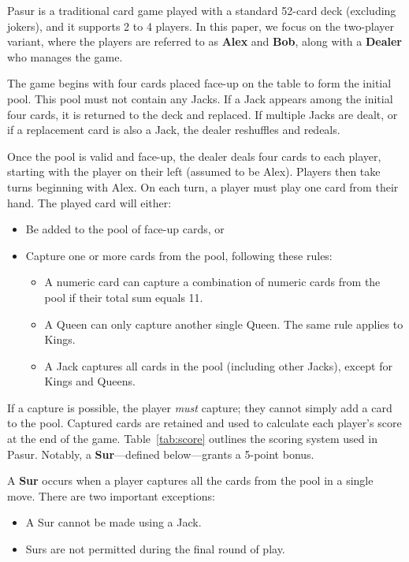 % 

Pasur is a traditional card game played with a standard 52-card deck (excluding jokers), and it supports 2 to 4 players. In this paper, we focus on the two-player variant, where the players are referred to as \textbf{Alex} and \textbf{Bob}, along with a \textbf{Dealer} who manages the game.

The game begins with four cards placed face-up on the table to form the initial pool. This pool must not contain any Jacks. If a Jack appears among the initial four cards, it is returned to the deck and replaced. If multiple Jacks are dealt, or if a replacement card is also a Jack, the dealer reshuffles and redeals.

Once the pool is valid and face-up, the dealer deals four cards to each player, starting with the player on their left (assumed to be Alex). Players then take turns beginning with Alex. On each turn, a player must play one card from their hand. The played card will either:

\begin{itemize}
    \item Be added to the pool of face-up cards, or
    \item Capture one or more cards from the pool, following these rules:
    \begin{itemize}
        \item A numeric card can capture a combination of numeric cards from the pool if their total sum equals 11.
        \item A Queen can only capture another single Queen. The same rule applies to Kings.
        \item A Jack captures all cards in the pool (including other Jacks), except for Kings and Queens.
    \end{itemize}
\end{itemize}

If a capture is possible, the player \emph{must} capture; they cannot simply add a card to the pool. Captured cards are retained and used to calculate each player’s score at the end of the game. Table~\ref{tab:score} outlines the scoring system used in Pasur. Notably, a \textbf{Sur}—defined below—grants a 5-point bonus.

A \textbf{Sur} occurs when a player captures all the cards from the pool in a single move. There are two important exceptions:
\begin{itemize}
    \item A Sur cannot be made using a Jack.
    \item Surs are not permitted during the final round of play.
\end{itemize}

